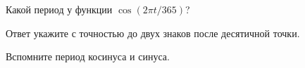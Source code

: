 
\begin{question}
Какой период у функции \(\cos(2 \pi t / 365)\)?

Ответ укажите с точностью до двух знаков после десятичной точки.
\end{question}

\begin{solution}
Вспомните период косинуса и синуса.
\end{solution}

